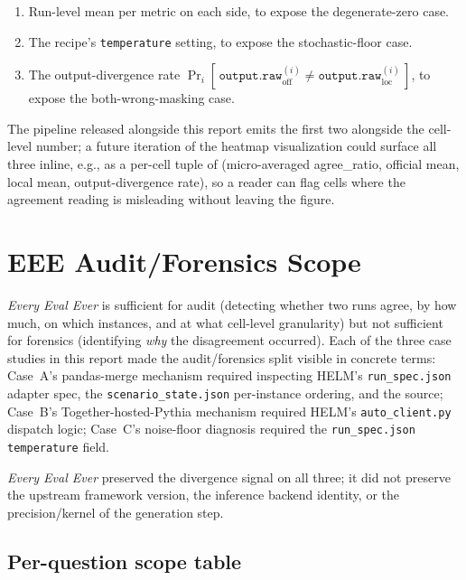 \documentclass[11pt]{article}
\newcommand{\eee}{\textit{Every Eval Ever}\xspace}
\begin{document}
\begin{enumerate}
  \item Run-level mean per metric on each side, to expose the
        degenerate-zero case.
  \item The recipe's \texttt{temperature} setting, to expose the
        stochastic-floor case.
  \item The output-divergence rate
        $\Pr_i[\,\texttt{output.raw}_{\mathrm{off}}^{(i)} \neq
        \texttt{output.raw}_{\mathrm{loc}}^{(i)}\,]$,
        to expose the both-wrong-masking case.
\end{enumerate}

The pipeline released alongside this report emits the first two
  alongside the cell-level number; a future iteration of the heatmap
  visualization could surface all three inline, e.g., as a per-cell
  tuple of (micro-averaged agree\_ratio, official mean, local mean,
  output-divergence rate), so a reader can flag cells where the
  agreement reading is misleading without leaving the figure.


\section{EEE Audit/Forensics Scope}
\label{sec:tr-scope-split}

\eee{} is sufficient for audit (detecting whether two runs agree, by
  how much, on which instances, and at what cell-level granularity)
  but not sufficient for forensics (identifying \emph{why} the
  disagreement occurred).
Each of the three case studies in this report made the
  audit/forensics split visible in concrete terms:
  Case~A's pandas-merge mechanism required inspecting HELM's
  \texttt{run\_spec.json} adapter spec, the
  \texttt{scenario\_state.json} per-instance ordering, and the
   source;
  Case~B's Together-hosted-Pythia mechanism required HELM's
  \texttt{auto\_client.py} dispatch logic;
  Case~C's noise-floor diagnosis required the
  \texttt{run\_spec.json} \texttt{temperature} field.

\eee{} preserved the divergence signal on all three; it did not
  preserve the upstream framework version, the inference backend
  identity, or the precision/kernel of the generation step.

\subsection{Per-question scope table}
\label{sec:tr-scope-table}
\end{document}
